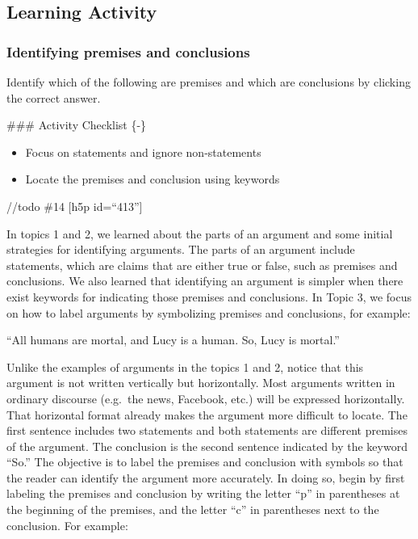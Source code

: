 \documentclass[
]{book}
\begin{document}
\hypertarget{learning-activity}{%
\subsection*{Learning Activity}\label{learning-activity}}

\hypertarget{identifying-premises-and-conclusions}{%
\subsubsection*{Identifying premises and conclusions}\label{identifying-premises-and-conclusions}}

\begin{reflect}
Identify which of the following are premises and which are conclusions by clicking the correct answer.
\end{reflect}
\#\#\# Activity Checklist \{-\}

\begin{reflect}
\begin{itemize}
\item
  Focus on statements and ignore non-statements
\item
  Locate the premises and conclusion using keywords
\end{itemize}
\end{reflect}

//todo \#14
{[}h5p id=``413''{]}

In topics 1 and 2, we learned about the parts of an argument and some initial strategies for identifying arguments. The parts of an argument include statements, which are claims that are either true or false, such as premises and conclusions. We also learned that identifying an argument is simpler when there exist keywords for indicating those premises and conclusions. In Topic 3, we focus on how to label arguments by symbolizing premises and conclusions, for example:

``All humans are mortal, and Lucy is a human. So, Lucy is mortal.''

Unlike the examples of arguments in the topics 1 and 2, notice that this argument is not written vertically but horizontally. Most arguments written in ordinary discourse (e.g.~the news, Facebook, etc.) will be expressed horizontally. That horizontal format already makes the argument more difficult to locate. The first sentence includes two statements and both statements are different premises of the argument. The conclusion is the second sentence indicated by the keyword ``So.'' The objective is to label the premises and conclusion with symbols so that the reader can identify the argument more accurately. In doing so, begin by first labeling the premises and conclusion by writing the letter ``p'' in parentheses at the beginning of the premises, and the letter ``c'' in parentheses next to the conclusion. For example:
\end{document}

